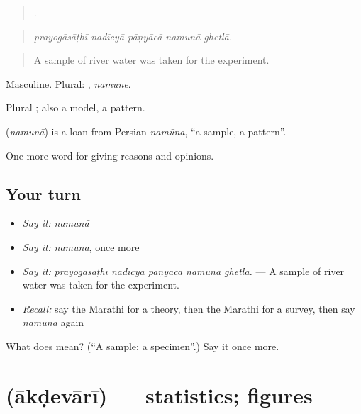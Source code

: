 \begin{quote}
    .
\end{quote}

\begin{quote}
\emph{prayogāsāṭhī nadīcyā pāṇyācā namunā ghetlā.}
\end{quote}

\begin{quote}
A sample of river water was taken for the experiment.
\end{quote}

Masculine. Plural: , \emph{namune}.

Plural ; also a model, a pattern.

\begin{cousinweb}
\textbf{} (\emph{namunā}) is a loan from Persian \emph{namūna}, \textquotedblleft{}a sample, a pattern\textquotedblright{}.
\end{cousinweb}

\begin{grammarlens}[title={What you've built}]
One more word for giving reasons and opinions.
\end{grammarlens}

\subsection*{Your turn}
\begin{itemize}
\raggedright
  \item \emph{Say it:} \emph{namunā}
  \item \emph{Say it:} \emph{namunā}, once more
  \item \emph{Say it:} \emph{prayogāsāṭhī nadīcyā pāṇyācā namunā ghetlā.} — A sample of river water was taken for the experiment.
  \item \emph{Recall:} say the Marathi for a theory, then the Marathi for a survey, then say \emph{namunā} again
\end{itemize}

\begin{tcolorbox}[breakable,colback=teal!4,colframe=teal!35!black,title={Before you move on}]
What does  mean? (\textquotedblleft{}A sample; a specimen\textquotedblright{}.) Say it once more.
\end{tcolorbox}
\section[\texorpdfstring{\mr{आकडेवारी} (ākḍevārī)}{आकडेवारी (ākḍevārī)}]{ (ākḍevārī) — statistics; figures}


